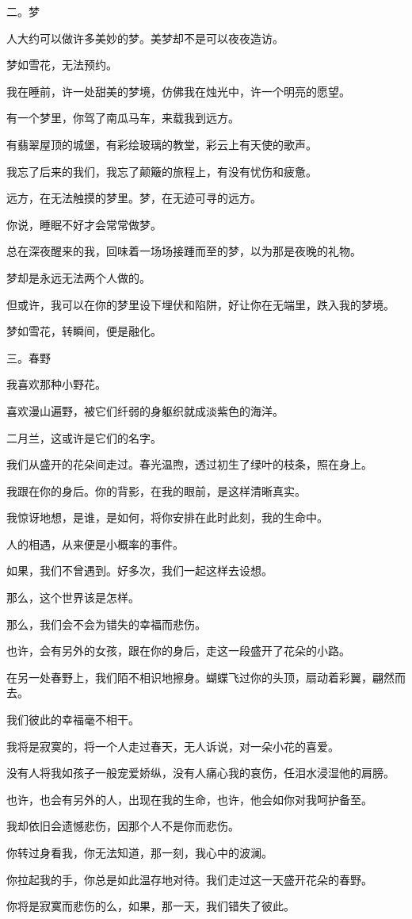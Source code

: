 \documentclass[12pt,a4paper]{article}
\newcommand{\subpart}[1]{
	\begingroup \par
	\vspace{1ex} \centering #1
	\par \endgroup \nopagebreak[4]
}
\begin{document}
		\subpart{二。梦}

		人大约可以做许多美妙的梦。美梦却不是可以夜夜造访。\par
		梦如雪花，无法预约。\par
		我在睡前，许一处甜美的梦境，仿佛我在烛光中，许一个明亮的愿望。\par
		有一个梦里，你驾了南瓜马车，来载我到远方。\par
		有翡翠屋顶的城堡，有彩绘玻璃的教堂，彩云上有天使的歌声。\par
		我忘了后来的我们，我忘了颠簸的旅程上，有没有忧伤和疲惫。\par
		远方，在无法触摸的梦里。梦，在无迹可寻的远方。\par
		你说，睡眠不好才会常常做梦。\par
		总在深夜醒来的我，回味着一场场接踵而至的梦，以为那是夜晚的礼物。\par
		梦却是永远无法两个人做的。\par
		但或许，我可以在你的梦里设下埋伏和陷阱，好让你在无端里，跌入我的梦境。\par
		梦如雪花，转瞬间，便是融化。

		\subpart{三。春野}

		我喜欢那种小野花。\par
		喜欢漫山遍野，被它们纤弱的身躯织就成淡紫色的海洋。\par
		二月兰，这或许是它们的名字。\par
		我们从盛开的花朵间走过。春光温煦，透过初生了绿叶的枝条，照在身上。\par
		我跟在你的身后。你的背影，在我的眼前，是这样清晰真实。\par
		我惊讶地想，是谁，是如何，将你安排在此时此刻，我的生命中。\par
		人的相遇，从来便是小概率的事件。\par
		如果，我们不曾遇到。好多次，我们一起这样去设想。\par
		那么，这个世界该是怎样。\par
		那么，我们会不会为错失的幸福而悲伤。\par
		也许，会有另外的女孩，跟在你的身后，走这一段盛开了花朵的小路。\par
		在另一处春野上，我们陌不相识地擦身。蝴蝶飞过你的头顶，扇动着彩翼，翩然而去。\par
		我们彼此的幸福毫不相干。\par
		我将是寂寞的，将一个人走过春天，无人诉说，对一朵小花的喜爱。\par
		没有人将我如孩子一般宠爱娇纵，没有人痛心我的哀伤，任泪水浸湿他的肩膀。\par
		也许，也会有另外的人，出现在我的生命，也许，他会如你对我呵护备至。\par
		我却依旧会遗憾悲伤，因那个人不是你而悲伤。\par
		你转过身看我，你无法知道，那一刻，我心中的波澜。\par
		你拉起我的手，你总是如此温存地对待。我们走过这一天盛开花朵的春野。\par
		你将是寂寞而悲伤的么，如果，那一天，我们错失了彼此。
\end{document}

